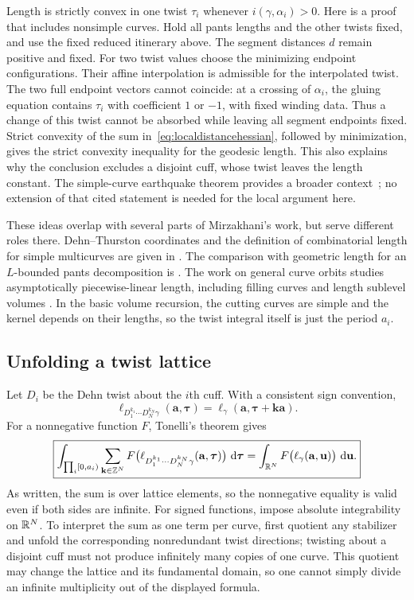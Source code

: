 Length is strictly convex in one twist $\tau_i$ whenever
$i(\gamma,\alpha_i)>0$. Here is a proof that includes nonsimple curves.
Hold all pants lengths and the other twists fixed, and use the fixed
reduced itinerary above. The segment distances $d$ remain positive and
fixed. For two twist values choose the minimizing endpoint configurations.
Their affine interpolation is admissible for the interpolated twist.
The two full endpoint vectors cannot coincide: at a crossing of
$\alpha_i$, the gluing equation contains $\tau_i$ with coefficient
$1$ or $-1$, with fixed winding data. Thus a change of this twist cannot
be absorbed while leaving all segment endpoints fixed. Strict convexity
of the sum in~\eqref{eq:localdistancehessian}, followed by minimization,
gives the strict convexity inequality for the geodesic length. This also
explains why the conclusion excludes a disjoint cuff, whose twist leaves
the length constant. The simple-curve earthquake theorem provides a
broader context~\cite[Theorem 1]{Kerckhoff}; no extension of that cited
statement is needed for the local argument here.

These ideas overlap with several parts of Mirzakhani's work, but serve
different roles there. Dehn--Thurston coordinates and the definition of
combinatorial length for simple multicurves are given in
\cite[Theorem 3.4 and equation (3.6)]{MirzSimple}. The comparison with
geometric length for an $L$-bounded pants decomposition is
\cite[Proposition 3.5 and equation (3.7), p.~107]{MirzSimple}. The work
on general curve orbits studies asymptotically piecewise-linear length,
including filling curves and length sublevel volumes
\cite[Theorem 4.1 and Section 8]{MirzGeneral}. In the basic volume recursion, the
cutting curves are simple and the kernel depends on their lengths, so the
twist integral itself is just the period $a_i$.

\subsection{Unfolding a twist lattice}

Let $D_i$ be the Dehn twist about the $i$th cuff. With a consistent sign
convention,
\[
 \ell_{D_1^{k_1}\cdots D_N^{k_N}\gamma}(\mathbf a,\boldsymbol\tau)
 =\ell_\gamma(\mathbf a,\boldsymbol\tau+\mathbf k\mathbf a).
\]
For a nonnegative function $F$, Tonelli's theorem gives
\begin{equation}
 \boxed{
 \int_{\prod_i[0,a_i)}\sum_{\mathbf k\in\mathbb Z^N}
 F\bigl(\ell_{D_1^{k_1}\cdots D_N^{k_N}\gamma}
                  (\mathbf a,\boldsymbol\tau)\bigr)\,\mathop{}\!\mathrm d\boldsymbol\tau
 =\int_{\mathbb R^N}F\bigl(\ell_\gamma(\mathbf a,\mathbf u)\bigr)\,\mathop{}\!\mathrm d\mathbf u.}
 \label{eq:twistunfold}
\end{equation}
As written, the sum is over lattice elements, so the nonnegative equality
is valid even if both sides are infinite. For signed functions, impose
absolute integrability on $\mathbb R^N$. To interpret the sum as one term per
curve, first quotient any stabilizer and unfold the corresponding
nonredundant twist directions; twisting about a disjoint cuff must not
produce infinitely many copies of one curve. This quotient may change
the lattice and its fundamental domain, so one cannot simply divide an
infinite multiplicity out of the displayed formula.

